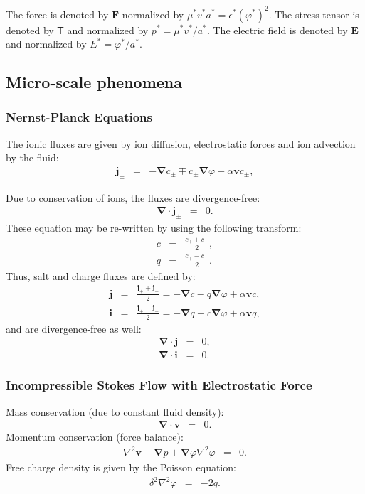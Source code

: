 \documentclass[final]{elsarticle}
\newcommand\eps \epsilon
\newcommand\Laplacian{\nabla^2}
\newcommand\bnabla{\boldsymbol{\nabla}}
\newcommand\bv{\boldsymbol{v}}
\newcommand\bE{\boldsymbol{E}}
\newcommand\bj{\boldsymbol{j}}
\newcommand\bi{\boldsymbol{i}}
\newcommand\bF{\boldsymbol{F}}
\newcommand\tT{\mathsf{T}}
\begin{document}
The force is denoted by $\bF$ normalized by $\mu^* v^* a^* = \eps^* (\varphi^*)^2$.
The stress tensor is denoted by $\tT$ and normalized by $p^* = \mu^* v^* / a^*$.
The electric field is denoted by $\bE$ and normalized by $E^* = \varphi^* / a^*$.

\subsection{Micro-scale phenomena}

\subsubsection{Nernst-Planck Equations}
The ionic fluxes are given by ion diffusion, electrostatic forces and ion advection by the fluid:
\begin{eqnarray*}
  \bj_\pm &=& -\bnabla c_\pm \mp c_\pm \bnabla \varphi + \alpha \bv c_\pm,
\end{eqnarray*}

Due to conservation of ions, the fluxes are divergence-free:
\begin{eqnarray*}
\bnabla \cdot \bj_\pm &=& 0.
\end{eqnarray*}
These equation may be re-written by using the following transform:
\begin{eqnarray*}
  c &=& \frac{c_+ + c_-}{2},\\
  q &=& \frac{c_+ - c_-}{2}.
\end{eqnarray*}
Thus, salt and charge fluxes are defined by:
\begin{eqnarray*}
  \bj &=& \frac{\bj_+ + \bj_-}{2} = -\bnabla c - q \bnabla \varphi + \alpha \bv c, \\
  \bi &=& \frac{\bj_+ - \bj_-}{2} = -\bnabla q - c \bnabla \varphi + \alpha \bv q,
\end{eqnarray*}
and are divergence-free as well:
\begin{eqnarray*}
\bnabla \cdot \bj &=& 0, \\
\bnabla \cdot \bi &=& 0. 
\end{eqnarray*}

\subsubsection{Incompressible Stokes Flow with Electrostatic Force}
Mass conservation (due to constant fluid density):
\begin{eqnarray*}
\bnabla \cdot \bv &=& 0.
\end{eqnarray*}
Momentum conservation (force balance):
\begin{eqnarray*}
\Laplacian \bv - \bnabla p + \bnabla \varphi \Laplacian \varphi &=& 0.
\end{eqnarray*}
Free charge density is given by the Poisson equation:
\begin{eqnarray*}
\delta^2 \Laplacian \varphi &=& -2q.
\end{eqnarray*}
\end{document}
